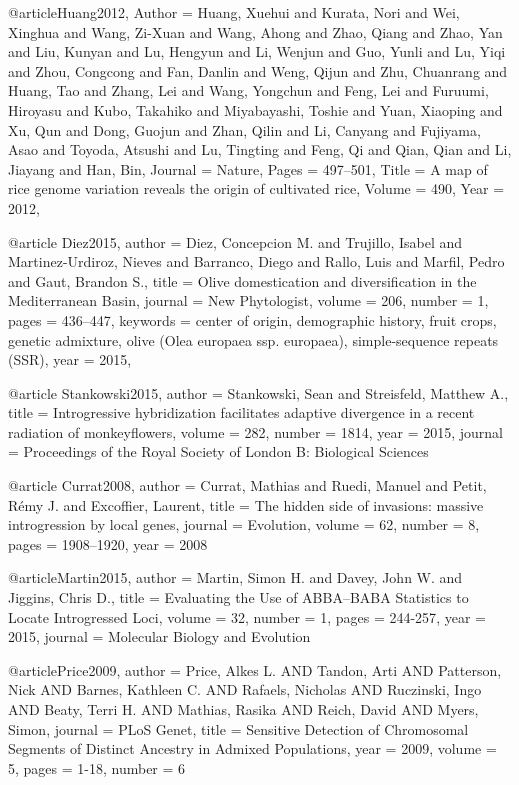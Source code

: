 @article{Huang2012,
	Author = {Huang, Xuehui and Kurata, Nori and Wei, Xinghua and Wang, Zi-Xuan and Wang, Ahong and Zhao, Qiang and Zhao, Yan and Liu, Kunyan and Lu, Hengyun and Li, Wenjun and Guo, Yunli and Lu, Yiqi and Zhou, Congcong and Fan, Danlin and Weng, Qijun and Zhu, Chuanrang and Huang, Tao and Zhang, Lei and Wang, Yongchun and Feng, Lei and Furuumi, Hiroyasu and Kubo, Takahiko and Miyabayashi, Toshie and Yuan, Xiaoping and Xu, Qun and Dong, Guojun and Zhan, Qilin and Li, Canyang and Fujiyama, Asao and Toyoda, Atsushi and Lu, Tingting and Feng, Qi and Qian, Qian and Li, Jiayang and Han, Bin},
	Journal = {Nature},
	Pages = {497--501},
	Title = {A map of rice genome variation reveals the origin of cultivated rice},
	Volume = {490},
	Year = {2012},
	}
	
@article {Diez2015,
author = {Diez, Concepcion M. and Trujillo, Isabel and Martinez-Urdiroz, Nieves and Barranco, Diego and Rallo, Luis and Marfil, Pedro and Gaut, Brandon S.},
title = {Olive domestication and diversification in the Mediterranean Basin},
journal = {New Phytologist},
volume = {206},
number = {1},
pages = {436--447},
keywords = {center of origin, demographic history, fruit crops, genetic admixture, olive (Olea europaea ssp. europaea), simple-sequence repeats (SSR)},
year = {2015},
}

@article {Stankowski2015,
	author = {Stankowski, Sean and Streisfeld, Matthew A.},
	title = {Introgressive hybridization facilitates adaptive divergence in a recent radiation of monkeyflowers},
	volume = {282},
	number = {1814},
	year = {2015},
	journal = {Proceedings of the Royal Society of London B: Biological Sciences}
}

@article {Currat2008,
author = {Currat, Mathias and Ruedi, Manuel and Petit, Rémy J. and Excoffier, Laurent},
title = {The hidden side of invasions: massive introgression by local genes},
journal = {Evolution},
volume = {62},
number = {8},
pages = {1908--1920},
year = {2008}
}

@article{Martin2015,
author = {Martin, Simon H. and Davey, John W. and Jiggins, Chris D.}, 
title = {Evaluating the Use of ABBA–BABA Statistics to Locate Introgressed Loci},
volume = {32}, 
number = {1}, 
pages = {244-257}, 
year = {2015}, 
journal = {Molecular Biology and Evolution} 
}

@article{Price2009,
    author = {Price, Alkes L. AND Tandon, Arti AND Patterson, Nick AND Barnes, Kathleen C. AND Rafaels, Nicholas AND Ruczinski, Ingo AND Beaty, Terri H. AND Mathias, Rasika AND Reich, David AND Myers, Simon},
    journal = {PLoS Genet},
    title = {Sensitive Detection of Chromosomal Segments of Distinct Ancestry in Admixed Populations},
    year = {2009},
    volume = {5},
    pages = {1-18},
    number = {6}
}

